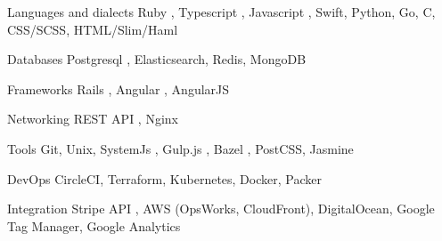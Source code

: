
\begin{cvskills}

  \cvskill
    {Languages and dialects} %
    {Ruby \cvstar, Typescript \cvstar, Javascript \cvstar, Swift, Python, Go, C, CSS/SCSS, HTML/Slim/Haml} %

  \cvskill
    {Databases} %
    {Postgresql \cvstar, Elasticsearch, Redis, MongoDB} %

  \cvskill
    {Frameworks} %
    {Rails \cvstar, Angular \cvstar, AngularJS} %

  \cvskill
    {Networking} %
    {REST API \cvstar, Nginx} %

  \cvskill
    {Tools} %
    {Git, Unix, SystemJs \cvstar, Gulp.js \cvstar, Bazel \cvstar, PostCSS, Jasmine} %

  \cvskill
    {DevOps} %
    {CircleCI, Terraform, Kubernetes, Docker, Packer} %


  \cvskill
    {Integration} %
    {Stripe API \cvstar, AWS (OpsWorks, CloudFront), DigitalOcean, Google Tag Manager, Google Analytics} %


\end{cvskills}
